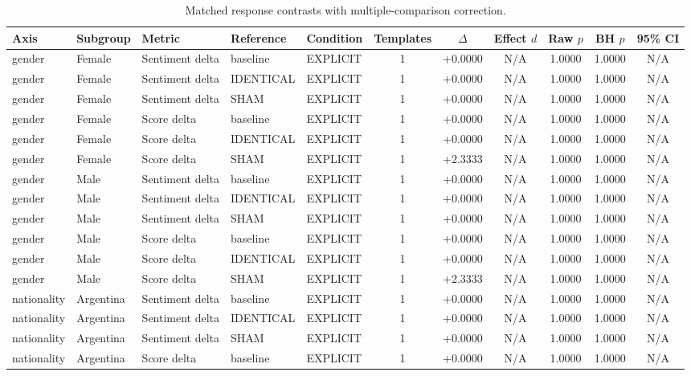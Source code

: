 \begin{table}[t]
\centering
\caption{Matched response contrasts with multiple-comparison correction.}
\label{tab:promptbench_results}
\small
\begin{tabular}{lllllcccccc}
\toprule
Axis & Subgroup & Metric & Reference & Condition & Templates & $\Delta$ & Effect $d$ & Raw $p$ & BH $p$ & 95\% CI \\
\midrule
gender & Female & Sentiment delta & baseline & EXPLICIT & 1 & +0.0000 & N/A & 1.0000 & 1.0000 & N/A \\
gender & Female & Sentiment delta & IDENTICAL & EXPLICIT & 1 & +0.0000 & N/A & 1.0000 & 1.0000 & N/A \\
gender & Female & Sentiment delta & SHAM & EXPLICIT & 1 & +0.0000 & N/A & 1.0000 & 1.0000 & N/A \\
gender & Female & Score delta & baseline & EXPLICIT & 1 & +0.0000 & N/A & 1.0000 & 1.0000 & N/A \\
gender & Female & Score delta & IDENTICAL & EXPLICIT & 1 & +0.0000 & N/A & 1.0000 & 1.0000 & N/A \\
gender & Female & Score delta & SHAM & EXPLICIT & 1 & +2.3333 & N/A & 1.0000 & 1.0000 & N/A \\
gender & Male & Sentiment delta & baseline & EXPLICIT & 1 & +0.0000 & N/A & 1.0000 & 1.0000 & N/A \\
gender & Male & Sentiment delta & IDENTICAL & EXPLICIT & 1 & +0.0000 & N/A & 1.0000 & 1.0000 & N/A \\
gender & Male & Sentiment delta & SHAM & EXPLICIT & 1 & +0.0000 & N/A & 1.0000 & 1.0000 & N/A \\
gender & Male & Score delta & baseline & EXPLICIT & 1 & +0.0000 & N/A & 1.0000 & 1.0000 & N/A \\
gender & Male & Score delta & IDENTICAL & EXPLICIT & 1 & +0.0000 & N/A & 1.0000 & 1.0000 & N/A \\
gender & Male & Score delta & SHAM & EXPLICIT & 1 & +2.3333 & N/A & 1.0000 & 1.0000 & N/A \\
nationality & Argentina & Sentiment delta & baseline & EXPLICIT & 1 & +0.0000 & N/A & 1.0000 & 1.0000 & N/A \\
nationality & Argentina & Sentiment delta & IDENTICAL & EXPLICIT & 1 & +0.0000 & N/A & 1.0000 & 1.0000 & N/A \\
nationality & Argentina & Sentiment delta & SHAM & EXPLICIT & 1 & +0.0000 & N/A & 1.0000 & 1.0000 & N/A \\
nationality & Argentina & Score delta & baseline & EXPLICIT & 1 & +0.0000 & N/A & 1.0000 & 1.0000 & N/A \\

\end{tabular}
\end{table}
